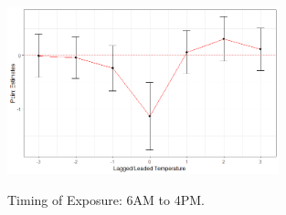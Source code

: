\documentclass{article}
\begin{document}
	
	\begin{figure}[h!]
		\centering
		\caption{Timing of Exposure: 6AM to 4PM.}
		\includegraphics[width=0.7\textwidth]{paper_fig4.jpg}
		\label{fig:paper_fig4}
	\end{figure}
	
	
	
\end{document}
